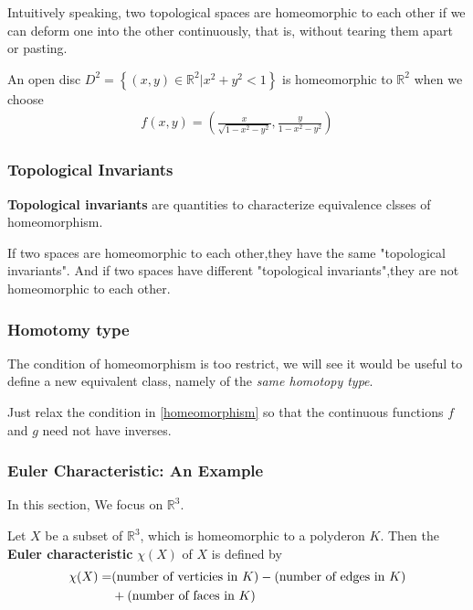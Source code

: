 \documentclass[10pt]{article}
\begin{document}
Intuitively speaking, two topological spaces are homeomorphic to each other if we can deform one into the other continuously, that is, without tearing them apart or pasting.
\begin{example}
    An open disc $D^2= \left\{ (x,y)\in\mathbb{R}^{2}|x^2+y^2<1 \right\}$ is homeomorphic to $\mathbb{R}^2$ when we choose
    \begin{align}
        f(x,y)=\left(\frac{x}{\sqrt{1-x^2-y^2}},\frac{y}{1-x^2-y^2}\right)
    \end{align}
\end{example}

\subsubsection{Topological Invariants}
\textbf{Topological invariants} are quantities to characterize equivalence clsses of homeomorphism.

If two spaces are homeomorphic to each other,they have the same "topological invariants".
And if two spaces have different "topological invariants",they are not homeomorphic to each other.

\subsubsection{Homotomy type}
\begin{intu}
    The condition of homeomorphism is too restrict, we will see it would be useful to define a new equivalent class, namely of the \textit{same homotopy type}.
\end{intu}

Just relax the condition in \cref{homeomorphism} so that the continuous functions $f$ and $g$ need not have inverses.

\subsubsection{Euler Characteristic: An Example}
In this section, We focus on $\mathbb{R}^3$.
\begin{definition}
    Let $X$ be a subset of $\mathbb{R}^3$, which is homeomorphic to a polyderon $K$.
    Then the \textbf{Euler characteristic} $\chi(X)$ of $X$ is defined by
    \begin{align}
        \chi(X)= & (\text{number of verticies in}\ K)-(\text{number of edges in}\ K)\notag \\
                 & +(\text{number of faces in}\ K)
    \end{align}
\end{definition}
\end{document}
